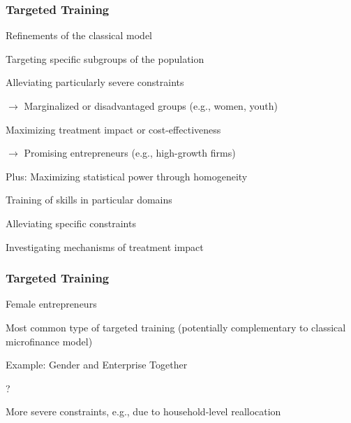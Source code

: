 \documentclass[hideothersubsections, usenames,dvipsnames,11pt]{beamer}
\newenvironment{itemize_2pt}{\itemize\addtolength{\itemsep}{2pt}}{\enditemize}
\begin{document}
\begin{frame}
\frametitle{Targeted Training}
	Refinements of the classical model
	
	\vspace{0.5em}
	
	\begin{itemize_2pt}
		\item Targeting \textcolor{bdf}{specific subgroups} of the population
		\begin{itemize_2pt}
			\item Alleviating \textcolor{bdf}{particularly severe constraints}
			\item[] $\rightarrow$ Marginalized or disadvantaged groups (e.g., women, youth)
			\item  Maximizing \textcolor{bdf}{treatment impact} or cost-effectiveness 
			\item[] $\rightarrow$ Promising entrepreneurs (e.g., high-growth firms)
			
			\vspace{0.5em}			
			
			\item Plus: \textcolor{bdf}{Maximizing statistical power} through homogeneity
		\end{itemize_2pt}
		
	\vspace{1.0em}		
		
		\item Training of skills in \textcolor{bdf}{particular domains}
		\begin{itemize_2pt}
			\item Alleviating \textcolor{bdf}{specific constraints}
			\item Investigating mechanisms of treatment impact
		\end{itemize_2pt}
	\end{itemize_2pt}
\end{frame}

\begin{frame}
\frametitle{Targeted Training}
	Female entrepreneurs
	\begin{itemize_2pt}
		\item \textcolor{bdf}{Most common type of targeted training} (potentially complementary to classical microfinance model)
		\item Example: Gender and Enterprise Together \citep[GET Ahead, ILO;][]{Bulte2016, McKenziePuerto2021}
		\item ?
		\item More severe constraints, e.g., due to household-level reallocation \citep{Bernhardt2019, deMel2009}
	\vspace{0.1in}
	\end{itemize_2pt}
\end{frame}
\end{document}
